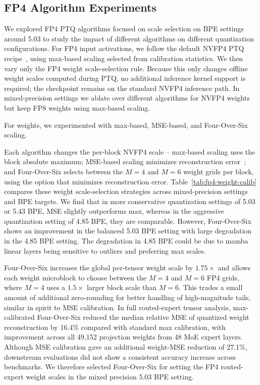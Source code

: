 \subsection{FP4 Algorithm Experiments}

We explored FP4 PTQ algorithms focused on scale selection on BPE settings around 5.03 to study the impact of different algorithms on different quantization configurations. For FP4 input activations, we follow the default NVFP4 PTQ
recipe~\citep{nvpfp4_ptq_default}, using max-based scaling selected from
calibration statistics. We then vary only the FP4 weight scale-selection rule.
Because this only changes offline weight scales computed during PTQ, no
additional inference kernel support is required; the checkpoint remains on the
standard NVFP4 inference path. In mixed-precision settings we ablate over different algorithms for NVFP4 weights but keep FP8 weights using max-based scaling. 

For weights, we experimented with max-based, MSE-based, and Four-Over-Six ~\citep{four_over_six} scaling. 

Each algorithm changes the per-block NVFP4 scale -- max-based scaling uses
the block absolute maximum; MSE-based scaling minimizes reconstruction
error~\citep{nvidia2026nemotron3superopen}; and
Four-Over-Six selects between the $M=4$ and $M=6$
weight grids per block, using the option that minimizes reconstruction error.
Table~\ref{tab:fp4-weight-calib} compares these weight scale-selection
strategies across mixed-precision settings and BPE targets. We find that in more conservative quantization settings of 5.03 or 5.43 BPE, MSE slightly outperforms max, whereas in the aggressive quantization setting of 4.85 BPE, they are comparable. However, Four-Over-Six shows an improvement in the balanced 5.03 BPE setting with large degradation in the 4.85 BPE setting. The degradation in 4.85 BPE could be due to mamba linear layers being sensitive to outliers and preferring max scales.

Four-Over-Six increases the global per-tensor weight scale by $1.75\times$ and
allows each weight microblock to choose between the $M=4$ and $M=6$ FP4 grids,
where $M=4$ uses a $1.5\times$ larger block scale than $M=6$.
This trades a small amount of additional zero-rounding for better handling of
high-magnitude tails, similar in spirit to MSE calibration. In full routed-expert
tensor analysis, max-calibrated Four-Over-Six reduced the median relative MSE of
quantized weight reconstruction by 16.4\% compared with standard max
calibration, with improvement across all 49,152 projection weights from 48 MoE
expert layers. Although MSE calibration gave an additional weight-MSE reduction of 27.1\%,
downstream evaluations did not show a consistent accuracy increase across
benchmarks. We therefore selected Four-Over-Six for setting the FP4 routed-expert
weight scales in the mixed precision 5.03 BPE setting.



